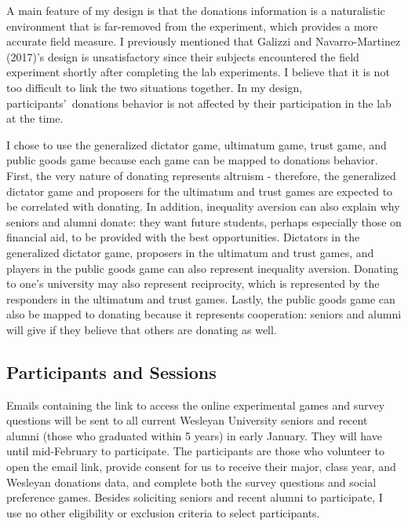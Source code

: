 \documentclass{article}
\begin{document}
A main feature of my design is that the donations information is a naturalistic environment that is far-removed from the experiment, which provides a more accurate field measure. I previously mentioned that Galizzi and Navarro-Martinez (2017)\rq s design is unsatisfactory since their subjects encountered the field experiment shortly after completing the lab experiments. I believe that it is not too difficult to link the two situations together. In my design, participants\rq \ donations behavior is not affected by their participation in the lab at the time. 

I chose to use the generalized dictator game, ultimatum game, trust game, and public goods game because each game can be mapped to donations behavior. First, the very nature of donating represents altruism - therefore, the generalized dictator game and proposers for the ultimatum and trust games are expected to be correlated with donating. In addition, inequality aversion can also explain why seniors and alumni donate: they want future students, perhaps especially those on financial aid, to be provided with the best opportunities. Dictators in the generalized dictator game, proposers in the ultimatum and trust games, and players in the public goods game can also represent inequality aversion.  Donating to one's university may also represent reciprocity, which is represented by the responders in the ultimatum and trust games. Lastly, the public goods game can also be mapped to donating because it represents cooperation: seniors and alumni will give if they believe that others are donating as well. 
	
\subsection{Participants and Sessions}
Emails containing the link to access the online experimental games and survey questions will be sent to all current Wesleyan University seniors and recent alumni (those who graduated within 5 years) in early January. They will have until mid-February to participate. The participants are those who volunteer to open the email link, provide consent for us to receive their major, class year, and Wesleyan donations data, and complete both the survey questions and social preference games. Besides soliciting seniors and recent alumni to participate, I use no other eligibility or exclusion criteria to select participants.
\end{document}

